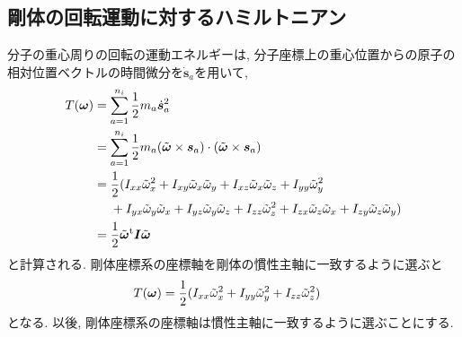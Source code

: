 
\subsection{剛体の回転運動に対するハミルトニアン}

分子の重心周りの回転の運動エネルギーは, 分子座標上の重心位置からの原子の相対位置ベクトルの時間微分を$\dot{\bm{s}}_{a}$を用いて,
\begin{align}
 T(\bm{\omega})
 &=
 \sum_{a=1}^{n_{i}} \frac{1}{2} m_{a} \dot{\bm{s}}_{a}^{2}
 \notag
 \\
 &=
 \sum_{a=1}^{n_{i}} \frac{1}{2} m_{a}
 (\tilde{\bm{\omega}} \times \bm{s}_{a})
 \cdot (\tilde{\bm{\omega}} \times \bm{s}_{a})
 \notag
 \\
 &=
 \frac{1}{2}
 (
 I_{xx} \Tilde{\omega}_{x}^{2}
+I_{xy} \Tilde{\omega}_{x}\Tilde{\omega}_{y}
+I_{xz} \Tilde{\omega}_{x}\Tilde{\omega}_{z}
+I_{yy} \Tilde{\omega}_{y}^{2}
\notag
\\ &~~~~
+I_{yx} \Tilde{\omega}_{y}\Tilde{\omega}_{x}
+I_{yz} \Tilde{\omega}_{y}\Tilde{\omega}_{z}
+I_{zz} \Tilde{\omega}_{z}^{2}
+I_{zx} \Tilde{\omega}_{z}\Tilde{\omega}_{x}
+I_{zy} \Tilde{\omega}_{z}\Tilde{\omega}_{y}
 )
 \notag \\
 &=
  \frac{1}{2}
  \Tilde{\bm{\omega}}^{\mathrm{t}} \bm{I} \Tilde{\bm{\omega}}
\label{eq:RigidBodyMD17}
\end{align}
と計算される. 剛体座標系の座標軸を剛体の慣性主軸に一致するように選ぶと
\begin{align}
 T(\bm{\omega})
 &=
 \frac{1}{2}
 (
 I_{xx} \Tilde{\omega}_{x}^{2}
+I_{yy} \Tilde{\omega}_{y}^{2}
+I_{zz} \Tilde{\omega}_{z}^{2}
 )
\label{eq:RigidBodyMD18}
\end{align}
となる. 以後, 剛体座標系の座標軸は慣性主軸に一致するように選ぶことにする.

